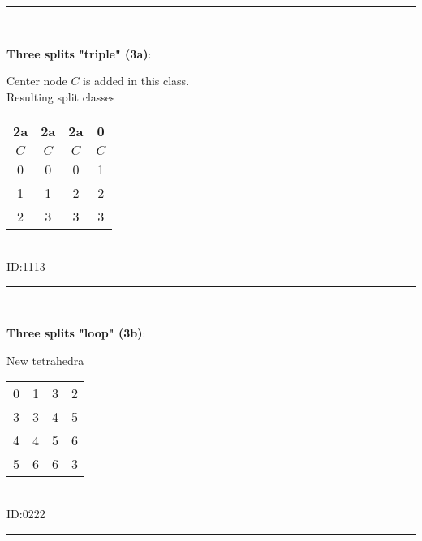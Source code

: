 \documentclass{article}
\begin{document}
	\rule{\textwidth}{0.5pt}
	\\

	\begin{minipage}{0.5\textwidth}
		\textbf{Three splits "triple" (3a)}:

		\begin{center}
			
		\end{center}
	\end{minipage}
	\begin{minipage}{0.5\textwidth}
		Center node $C$ is added in this class.
		\\

		Resulting split classes

		\begin{tabular}{cccc}
			\hline
			2a & 2a & 2a & 0 \\
			\hline
			$C$ & $C$ & $C$ & $C$ \\
			0 & 0 & 0 & 1 \\
			1 & 1 & 2 & 2 \\
			2 & 3 & 3 & 3
		\end{tabular}
		\\

		ID:1113
	\end{minipage}

	\rule{\textwidth}{0.5pt}
	\\

	\begin{minipage}{0.5\textwidth}
		\textbf{Three splits "loop" (3b)}:

		\begin{center}
			
		\end{center}
	\end{minipage}
	\begin{minipage}{0.5\textwidth}
		New tetrahedra

		\begin{tabular}{cccc}
			\hline
			0 & 1 & 3 & 2 \\
			3 & 3 & 4 & 5 \\
			4 & 4 & 5 & 6 \\
			5 & 6 & 6 & 3
		\end{tabular}
		\\

		ID:0222
	\end{minipage}

	\rule{\textwidth}{0.5pt}
	\\
\end{document}
